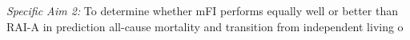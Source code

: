 \emph{Specific Aim 2:} To determine whether mFI performs equally well or better than RAI-A in prediction all-cause mortality and transition from independent living o